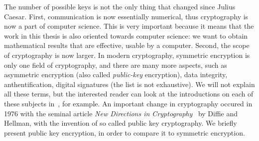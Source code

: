 The number of possible keys is not the only thing that changed since Julius
Caesar. First, communication is now essentially numerical, thus cryptography is
now a part of computer science. This is very important because it means that the
work in this thesis is also oriented towards computer science: we want to obtain
mathematical results that are effective, \ie usable by a computer.
Second, the scope of cryptography is now larger.
In modern cryptography, symmetric encryption is only one field of
cryptography, and there are many more aspects, such as asymmetric
encryption (also called \emph{public-key} encryption), data integrity,
anthentification, digital signatures (the list is not exhaustive). We will not
explain all these terms, but the interested reader can look at the introductions
on each of these subjects in~\cite{MVOV18}, for example. An important change in
cryptography occured in 1976 with the seminal article \emph{New Directions in
Cryptography}~\cite{DH76} by Diffie and Hellman, with the invention of so called
public key cryptography. We briefly present public key encryption, in order to
compare it to symmetric encryption.

